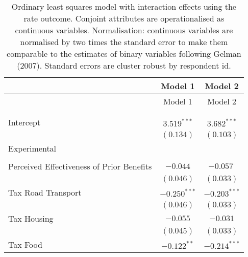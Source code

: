 
\begin{center}
\begin{tiny}
\begin{longtable}{l@{} c@{} c@{}}
\hline
 & Model 1 & Model 2 \\
\hline
\endfirsthead
\hline
 & Model 1 & Model 2 \\
\hline
\endhead
\hline
\endfoot
\hline
\multicolumn{3}{l}{\tiny{$^{***}p<0.001$; $^{**}p<0.01$; $^{*}p<0.05$; $^{\cdot}p<0.1$}}\\
\caption{Ordinary least squares model with interaction effects using the rate outcome. Conjoint attributes are operationalised as continuous variables. Normalisation: continuous variables are normalised by two times
               the standard error to make them comparable to the estimates of binary variables following Gelman (2007). Standard errors are cluster robust by respondent id.}
\label{table:linear_interactions_exp_continuous}
\endlastfoot \\
Intercept                                                                  & $3.519^{***}$    & $3.682^{***}$    \\
                                                                           & $(0.134)$        & $(0.103)$        \\
Experimental                                                               &                  &                  \\
                                                                           &                  &                  \\
\quad Perceived Effectiveness of Prior Benefits                            & $-0.044$         & $-0.057^{\cdot}$ \\
                                                                           & $(0.046)$        & $(0.033)$        \\
\quad Tax Road Transport                                                   & $-0.250^{***}$   & $-0.203^{***}$   \\
                                                                           & $(0.046)$        & $(0.033)$        \\
\quad Tax Housing                                                          & $-0.055$         & $-0.031$         \\
                                                                           & $(0.045)$        & $(0.033)$        \\
\quad Tax Food                                                             & $-0.122^{**}$    & $-0.214^{***}$   \\

\end{longtable}
\end{tiny}
\end{center}
